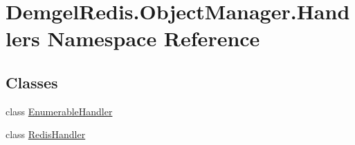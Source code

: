 \hypertarget{namespace_demgel_redis_1_1_object_manager_1_1_handlers}{}\section{Demgel\+Redis.\+Object\+Manager.\+Handlers Namespace Reference}
\label{namespace_demgel_redis_1_1_object_manager_1_1_handlers}
\subsection*{Classes}
\begin{DoxyCompactItemize}
\item 
class \hyperlink{class_demgel_redis_1_1_object_manager_1_1_handlers_1_1_enumerable_handler}{Enumerable\+Handler}
\item 
class \hyperlink{class_demgel_redis_1_1_object_manager_1_1_handlers_1_1_redis_handler}{Redis\+Handler}
\end{DoxyCompactItemize}
